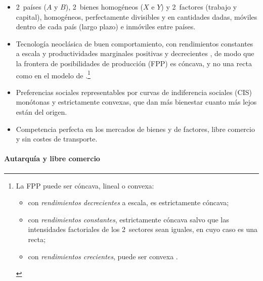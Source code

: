 \documentclass[11pt]{article}
\begin{document}
\begin{itemize}
\item 2~países ($A$ y $B$), 2~bienes homogéneos ($X$ e $Y$) y 2~factores (trabajo y capital), homogéneos, perfectamente divisibles y en cantidades dadas, móviles dentro de cada país (largo plazo) e inmóviles entre países.
\item Tecnología neoclásica de buen comportamiento, con rendimientos constantes a escala y productividades marginales positivas y decrecientes , de modo que la frontera de posibilidades de producción (FPP) es cóncava, y no una recta como en el modelo de .\footnote{La FPP puede ser cóncava, lineal o convexa:
\begin{itemize}
\item con \emph{rendimientos decrecientes} a escala, es estrictamente cóncava;
\item con \emph{rendimientos constantes}, estrictamente cóncava salvo que las intensidades factoriales de los 2~sectores sean iguales, en cuyo caso es una recta;
\item con \emph{rendimientos crecientes}, puede ser convexa .
\end{itemize}}
\item Preferencias sociales representables por curvas de indiferencia sociales (CIS) monótonas y estrictamente convexas, que dan más bienestar cuanto más lejos están del origen.
\item Competencia perfecta en los mercados de bienes y de factores, libre comercio y sin costes de transporte.
\end{itemize}

\paragraph{Autarquía y libre comercio}
\end{document}
